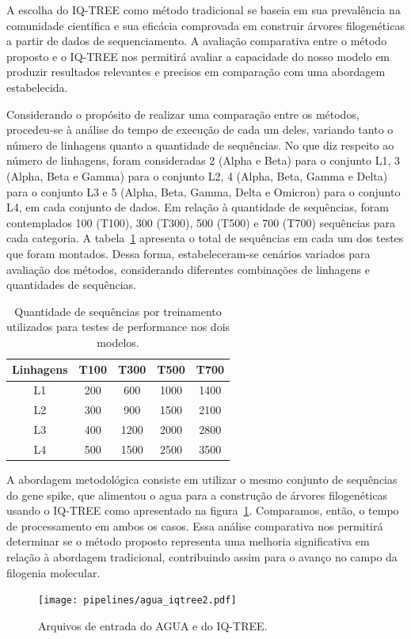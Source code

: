 A escolha do IQ-TREE como método tradicional se baseia em sua prevalência na comunidade científica e sua eficácia comprovada em construir árvores filogenéticas a partir de dados de sequenciamento. A avaliação comparativa entre o método proposto e o IQ-TREE nos permitirá avaliar a capacidade do nosso modelo em produzir resultados relevantes e precisos em comparação com uma abordagem estabelecida.

Considerando o propósito de realizar uma comparação entre os métodos, procedeu-se à análise do tempo de execução de cada um deles, variando tanto o número de linhagens quanto a quantidade de sequências. No que diz respeito ao número de linhagens, foram consideradas 2 (Alpha e Beta) para o conjunto L1, 3 (Alpha, Beta e Gamma) para o conjunto L2, 4 (Alpha, Beta, Gamma e Delta) para o conjunto L3 e 5 (Alpha, Beta, Gamma, Delta e Omicron) para o conjunto L4, em cada conjunto de dados. Em relação à quantidade de sequências, foram contemplados 100 (T100), 300 (T300), 500 (T500) e 700 (T700) sequências para cada categoria.
A tabela~\ref{tab:quantidadeSequenciasTeste} apresenta o total de sequências em cada um dos testes que foram montados.
Dessa forma, estabeleceram-se cenários variados para avaliação dos métodos, considerando diferentes combinações de linhagens e quantidades de sequências.

\begin{table}[htb]
  \caption{Quantidade de sequências por treinamento utilizados para testes de performance nos dois modelos.}
  \begin{center}
    \begin{tabular}{c|c|c|c|c}
      \hline
      Linhagens & T100 & T300 & T500 & T700 \\
      \hline
      L1        & 200  & 600  & 1000 & 1400 \\
      L2        & 300  & 900  & 1500 & 2100 \\
      L3        & 400  & 1200 & 2000 & 2800 \\
      L4        & 500  & 1500 & 2500 & 3500 \\
      \hline
    \end{tabular}
  \end{center}
  \label{tab:quantidadeSequenciasTeste}
\end{table}

A abordagem metodológica consiste em utilizar o mesmo conjunto de sequências do gene spike, que alimentou o \gls{agua} para a construção de árvores filogenéticas usando o IQ-TREE como apresentado na figura~\ref{fig:inputAguaIqtree}. Comparamos, então, o tempo de processamento em ambos os casos. Essa análise comparativa nos permitirá determinar se o método proposto representa uma melhoria significativa em relação à abordagem tradicional, contribuindo assim para o avanço no campo da filogenia molecular.
\begin{figure}[htb]
  \centering
  \caption{Arquivos de entrada do AGUA e do IQ-TREE.}
  \texttt{[image: pipelines/agua\_iqtree2.pdf]}
  ~\label{fig:inputAguaIqtree}
\end{figure}

